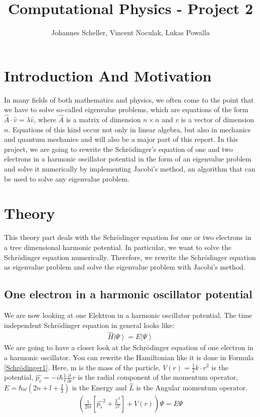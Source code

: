 \documentclass[10pt,a4paper]{article}
\author{Johannes Scheller, Vincent Noculak, Lukas Powalla}
\title{Computational Physics - Project 2}
\begin{document}
\maketitle
\newpage
\tableofcontents
\newpage
\section{Introduction And Motivation}
In many fields of both mathematics and physics, we often come to the point that we have to solve so-called eigenvalue problems, which are equations of the form $\hat{A}\cdot\hat{v}=\lambda\hat{v}$, where $\hat{A}$ is a matrix of dimension $n\times n$ and $v$ is a vector of dimension $n$. Equations of this kind occur not only in linear algebra, but also in mechanics and quantum mechanics and will also be a major part of this report. In this project, we are going to rewrite the Schrödinger's equation of one and two electrons in a harmonic oscillator potential in the form of an eigenvalue problem and solve it numerically by implementing Jacobi's method, an algorithm that can be used to solve any eigenvalue problem.






\section{Theory}
This theory part deals with the Schrödinger equation for one or two electrons in a tree dimensional harmonic potential. In particular, we want to solve the Schrödinger equation numerically. Therefore, we rewrite the Schrödinger equation as eigenvalue problem and solve the eigenvalue problem with Jacobi's method. 

\subsection{One electron in a harmonic oscillator potential \label{one electron in harm osc}}
We are now looking at one Elektron in a harmonic oscillator potential. 
The time independent Schrödinger equation in general looks like:
\begin{align}
\hat{H} \left|\Psi \right> = E \left|\Psi \right>
\end{align}
We are going to have a closer look at the Schrödinger equation of one electron in a harmonic oscillator. 
You can rewrite the Hamiltonian like it is done in Formula \ref{Schrödinger1}. Here, m is the mass of the particle, $V(r)=\frac{1}{2}k \cdot r^2$ is the potential, $\hat{p_r}=-i \hbar \frac{1}{r} \frac{\partial}{\partial r} r$ is the radial component of the momentum operator, $E=\hbar \omega (2n+l+\frac{2}{3})$ is the Energy and $\hat{L}$ is the Angular momentum operator. 
\begin{align}
\left( \frac{1}{2m} \left[ \hat{p_r}^2 + \frac{\hat{L}^2}{r^2}\right] +V(r) \right) \Psi = E \Psi \label{Schrödinger1}
\end{align}
\end{document}
